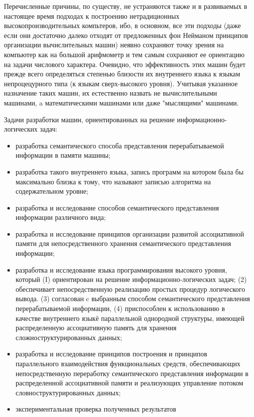 Перечисленные причины, по существу, не устраняются также и в развиваемых в настоящее время подходах к построению нетрадиционных высокопроизводительных компьтеров, ибо, в основном, все эти подходы (даже если они достаточно далеко отходят от предложенных фон Нейманом принципов организации вычислительных машин) неявно сохраняют точку зрения на компьютер как на большой арифмометр и тем самым сохраняют ее ориентацию на задачи числового характера. Очевидно, что эффективность этих машин будет прежде всего определяться степенью близости их внутреннего языка к языкам непроцецурного типа (к языкам сверх-высокого уровня). Учитывая указанное назначение таких машин, их естественно назвать не вычислительными машинами, a математическими машинами или даже "мыслящими"{} машинами.

\begin{SCn}
\end{SCn}

Задачи разработки машин, ориентированных на решение информационно-логических задач:

\begin{itemize}
	\item разработка семантического способа представления перерабатываемой информации в памяти машины;
	\item разработка такого внутреннего языка, запись программ на котором была бы максимально близка к тому, что называют записью алгоритма на содержательном уровне;
	\item разработка и исследование способов семантического представления информации различного вида;
	\item разработка и исследование принципов организации развитой ассоциативной памяти для непосредственного хранения семантического представления информации;
	\item разработка и исследование языка программирования высокого уровня, который (I) ориентирован на решение информационно-логических задач; (2) обеспечивает непосредственную реализацию простых процедур логического вывода. (3) согласован c выбранным способом семантического представления перерабатываемой информации, (4) приспособлен к использованию в качестве внутреннего языкё параллельной однородной структуры, имеющей распределенную ассоциативную память для хранения сложноструктурированных данных;
	\item разработка и исследование принципов построения и принципов параллельного взаимодействия функциональных средств, обеспечивающих непосредственную переработку семантического представления информации в распределенной ассоциативной памяти и реализующих управление потоком словноструктурированных данных;
	\item экспериментальная проверка полученных результатов
\end{itemize}

